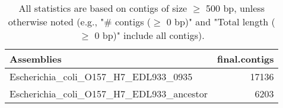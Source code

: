 \documentclass[12pt,a4paper]{article}
\begin{document}
\begin{table}[ht]
\begin{center}
\caption{All statistics are based on contigs of size $\geq$ 500 bp, unless otherwise noted (e.g., "\# contigs ($\geq$ 0 bp)" and "Total length ($\geq$ 0 bp)" include all contigs).}
\begin{tabular}{|l*{1}{|r}|}
\hline
Assemblies & final.contigs \\ \hline
Escherichia\_coli\_O157\_H7\_EDL933\_0935 & 17136 \\ \hline
Escherichia\_coli\_O157\_H7\_EDL933\_ancestor & 6203 \\ \hline
\end{tabular}
\end{center}
\end{table}
\end{document}
